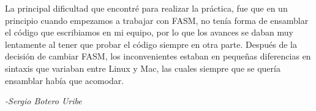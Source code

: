 
%
%
%

La principal dificultad que encontré para realizar la práctica, fue que en un principio cuando empezamos a trabajar con FASM, no tenía forma de ensamblar el código que escribiamos en mi equipo, por lo que los avances se daban muy lentamente al tener que probar el código siempre en otra parte. Después de la decisión de cambiar FASM, los inconvenientes estaban en pequeñas diferencias en sintaxis que variaban entre Linux y Mac, las cuales siempre que se quería ensamblar había que acomodar.


\begin{flushright} 
	\itshape{-Sergio Botero Uribe}
\end{flushright}
%